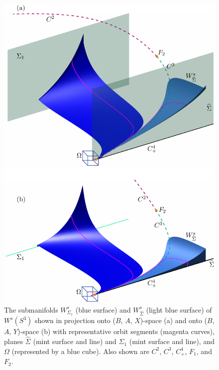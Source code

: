 \documentclass{ws-ijbc}
\begin{document}
\begin{figure}[H]
\centering
\includegraphics[]{./figures/MKMO_5.pdf}
\caption{The submanifolds $W^{s}_{\Sigma_1}$ (blue surface) and $W^{s}_{\widehat{\Sigma}}$ (light blue surface) of $W^s(S^3)$ shown in projection onto ($B$, $A$, $X$)-space (a) and onto ($B$, $A$, $Y$)-space (b) with representative orbit segments (magenta curves), planes $\widehat{\Sigma}$ (mint surface and line) and $\Sigma_1$ (mint surface and line), and $\Omega$ (represented by a blue cube).  Also shown are $C^2$, $C^3$, $C^4_+$, $F_1$, and $F_2$.}
\label{two_pieces}
\end{figure}
\end{document}
